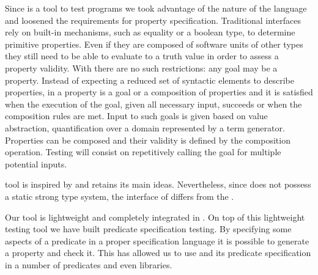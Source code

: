 Since \plqc{} is a tool to test \Prolog{} programs we took advantage of
the nature of the language and loosened the requirements for property
specification.
%
Traditional interfaces rely on built-in mechanisms, such as equality or
a boolean type, to determine primitive properties.
%
Even if they are composed of software units of other types they still
need to be able to evaluate to a truth value in order to assess a
property validity.
%
With \Prolog{} there are no such restrictions: any goal may be a property.
%
Instead of expecting a reduced set of syntactic elements to describe
properties, in \plqc{} a property is a goal or a composition of
properties and it is satisfied when the execution of the goal, given all
necessary input, succeeds or when the composition rules are met.
%
Input to such goals is given based on \plqc{} value abstraction,
quantification over a domain represented by a term generator.
%
Properties can be composed and their validity is defined by the
composition operation.
%
Testing will consist on repetitively calling the goal for multiple
potential inputs.


\plqc{} tool is inspired by \QuickCheck{} and retains its main
ideas.
%
%
Nevertheless, since \Prolog{} does not possess a static strong
type system, the interface of \plqc{} differs from the \Haskell\QuickCheck{}.


Our tool is
lightweight and completely integrated in \Prolog{}.
%
On top of this lightweight testing tool we have built predicate
specification testing.
%
By specifying some aspects of a predicate in a proper specification
language it is possible to generate a \plqc{} property and check it.
%
This has allowed us to  use \plqc{} and its predicate specification in a number of
predicates and even libraries.






